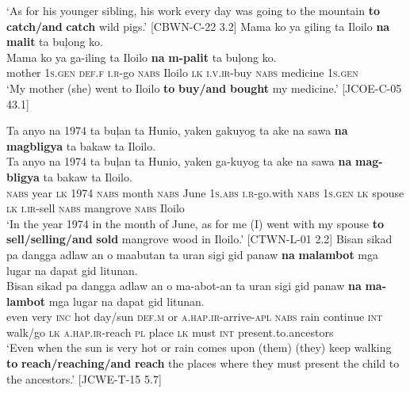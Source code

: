 \glt `As for his younger sibling, his work every day was going to the mountain \textbf{to} \textbf{catch/and} \textbf{catch} wild pigs.’ [CBWN-C-22 3.2]
\z
\ea
Mama  ko  ya  giling  ta  Iloilo  \textbf{na}  \textbf{malit}  ta  buļong  ko. \smallskip\\
\gll Mama  ko  ya  ga-iling  ta  Iloilo  \textbf{na}  \textbf{m-palit}  ta  buļong  ko. \\
mother  1\textsc{s.gen}  \textsc{def.f}  \textsc{i.r}-go  \textsc{nabs}  Iloilo  \textsc{lk}  \textsc{i.v.ir}-buy  \textsc{nabs}  medicine  1\textsc{s.gen} \\
\glt ‘My mother (she) went to Iloilo \textbf{to} \textbf{buy/and} \textbf{bought} my medicine.’ [JCOE-C-05 43.1]
\z

\newpage

\ea
Ta  anyo  na  1974  ta  buļan  ta  Hunio,  yaken  gakuyog  ta ake  na  sawa  \textbf{na}  \textbf{magbligya}  ta  bakaw  ta  Iloilo. \smallskip\\
\gll Ta  anyo  na  1974  ta  buļan  ta  Hunio,  yaken  ga-kuyog  ta ake  na  sawa  \textbf{na}  \textbf{mag-bligya}  ta  bakaw  ta  Iloilo. \\
\textsc{nabs}  year  \textsc{lk}  1974  \textsc{nabs}  month  \textsc{nabs}  June  1\textsc{s.abs}  \textsc{i.r}-go.with  \textsc{nabs}
1\textsc{s.gen}  \textsc{lk}  spouse  \textsc{lk}  \textsc{i.ir}-sell  \textsc{nabs}  mangrove  \textsc{nabs}  Iloilo \\
\glt `In the year 1974 in the month of June, as for me (I) went with my spouse \textbf{to}
\textbf{sell/selling/and} \textbf{sold} mangrove wood in Iloilo.’ [CTWN-L-01 2.2]
\z
\ea
Bisan  sikad  pa  dangga  adlaw  an  o  maabutan  ta  uran sigi  gid  panaw  \textbf{na}  \textbf{malambot}  mga  lugar  na  dapat gid  litunan. \smallskip\\
\gll Bisan  sikad  pa  dangga  adlaw  an  o  ma-abot-an  ta  uran sigi  gid  panaw  \textbf{na}  \textbf{ma-lambot}  mga  lugar  na  dapat gid  litunan. \\
even  very  \textsc{inc}  hot  day/sun  \textsc{def.m}  or  \textsc{a.hap.ir}-arrive-\textsc{apl}  \textsc{nabs}  rain continue  \textsc{int}  walk/go  \textsc{lk}  \textsc{a.hap.ir}-reach  \textsc{pl}  place  \textsc{lk}  must
\textsc{int}  present.to.ancestors \\
\glt `Even when the sun is very hot or rain comes upon (them) (they) keep walking \textbf{to} \textbf{reach/reaching/and} \textbf{reach} the places where they must present the child to the ancestors.’ [JCWE-T-15 5.7]
\z
\ea
